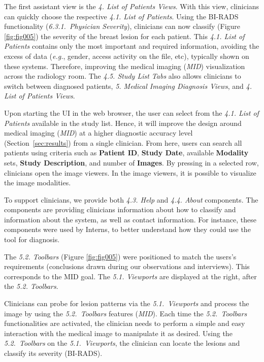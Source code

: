 The first assistant view is the {\it 4. List of Patients Views}.
With this view, clinicians can quickly choose the respective {\it 4.1. List of Patients}.
Using the BI-RADS functionality ({\it 6.3.1.~Physician Severity}), clinicians can now classify (Figure \ref{fig:fig005}) the severity of the breast lesion for each patient.
This {\it 4.1. List of Patients} contains only the most important and required information, avoiding the excess of data ({\it e.g.}, gender, access activity on the file, etc), typically shown on these systems.
Therefore, improving the medical imaging ({\it MID}) visualization across the radiology room.
The {\it 4.5. Study List Tabs} also allows clinicians to switch between diagnosed patients, {\it 5. Medical Imaging Diagnosis Views}, and {\it 4. List of Patients Views}.

Upon starting the UI in the web browser, the user can select from the {\it 4.1. List of Patients} available in the study list.
Hence, it will improve the design around medical imaging ({\it MID}) at a higher diagnostic accuracy level (Section~\ref{sec:results}) from a single clinician.
From here, users can search all patients using criteria such as {\bf Patient ID}, {\bf Study Date}, available {\bf Modality} sets, {\bf Study Description}, and number of {\bf Images}.
By pressing in a selected row, clinicians open the image viewers.
In the image viewers, it is possible to visualize the image modalities.

To support clinicians, we provide both {\it 4.3. Help} and {\it 4.4. About} components.
The components are providing clinicians information about how to classify and information about the system, as well as contact information.
For instance, these components were used by Interns, to better understand how they could use the tool for diagnosis.

The {\it 5.2. Toolbars} (Figure \ref{fig:fig005}) were positioned to match the users's requirements (conclusions drawn during our observations and interviews).
This corresponds to the MID goal.
The {\it 5.1. Viewports} are displayed at the right, after the {\it 5.2. Toolbars}.

Clinicians can probe for lesion patterns via the {\it 5.1.~Viewports} and process the image by using the {\it 5.2.~Toolbars} features ({\it MID}).
Each time the {\it 5.2.~Toolbars} functionalities are activated, the clinician needs to perform a simple and easy interaction with the medical image to manipulate it as desired.
Using the {\it 5.2.~Toolbars} on the {\it 5.1.~Viewports}, the clinician can locate the lesions and classify its severity (BI-RADS).

